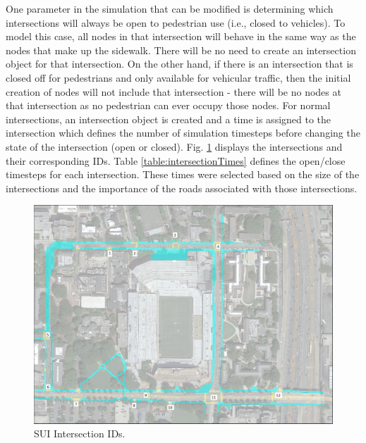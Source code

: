 \documentclass[12pt]{article}
\begin{document}
One parameter in the simulation that can be modified is determining which
intersections will always be open to pedestrian use (i.e., closed to vehicles).
To model this case, all nodes in that intersection will behave
in the same way as the nodes that make up the sidewalk. There will be no need to
create an intersection object for that intersection. On the other hand, if there
is an intersection that is closed off for pedestrians and only available for
vehicular traffic, then the initial creation of nodes will not include that
intersection - there will be no nodes at that intersection as no pedestrian can
ever occupy those nodes.
For normal intersections, an intersection object is created and a time is
assigned to the intersection which defines the number of simulation timesteps
before changing the state of the intersection (open or closed). Fig.
\ref{fig:intersectionMap} displays the intersections and their corresponding
IDs. Table \ref{table:intersectionTimes} defines the open/close timesteps for
each intersection. These times were selected based on the size of the
intersections and the importance of the roads associated with those
intersections.

\begin{figure}[H]
	\includegraphics[width=\linewidth,natwidth=1026,natheight=750]{GATechMap_IntersectionIDs.png}
	\caption{SUI Intersection IDs.}
	\label{fig:intersectionMap}
\end{figure}

\begin{table}[t]
	\centering
	\caption{Intersection Open/Close Timesteps}
	\label{table:intersectionTimes}
\end{table}
\end{document}
